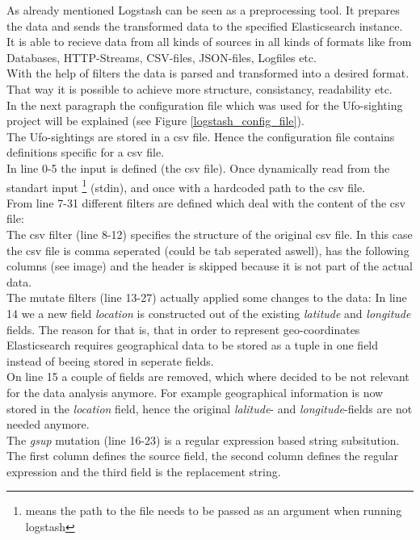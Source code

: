 \documentclass[bibliography=totoc]{article}
\begin{document}
As already mentioned Logstash can be seen as a preprocessing tool.
It prepares the data and sends the transformed data to the specified 
Elasticsearch instance.
It is able to recieve data from all kinds of sources in all kinds of formats like from Databases, HTTP-Streams, 
CSV-files, JSON-files, Logfiles etc.
\\
With the help of filters the data is parsed and transformed into a
desired format. That way it is possible to achieve more structure, consistancy,
readability etc.
\\
In the next paragraph the configuration file which was used for the
Ufo-sighting project will be explained (see Figure \ref{logstash_config_file}).
\\
The Ufo-sightings are stored in a csv file. Hence the configuration file 
contains definitions specific for a csv file.
\\
In line 0-5 the input is defined (the csv file). Once dynamically read 
from the standart input \footnote{means the path to the file needs to be passed as an argument when running logstash} (stdin),
and once with a hardcoded path to the csv file.
\\
From line 7-31 different filters are defined which deal with the content 
of the csv file:
\\
The csv filter (line 8-12) specifies the structure of the original csv file.
In this case the csv file is comma seperated (could be tab seperated aswell),
has the following columns (see image) and the header is skipped because
it is not part of the actual data.
\\
The mutate filters (line 13-27) actually applied some changes to the data:
In line 14 we a new field \textit{location} is constructed out of the 
existing \textit{latitude} and \textit{longitude} fields. The reason for 
that is, that in order to represent geo-coordinates Elasticsearch requires geographical data to be stored as a tuple
in one field instead of beeing stored in seperate fields.
\\
On line 15 a couple of fields are removed, which where decided to be not relevant
for the data analysis anymore. For example geographical information is now 
stored in the \textit{location} field, hence the original \textit{lalitude}- and \textit{longitude}-fields
are not needed anymore.
\\
The \textit{gsup} mutation (line 16-23) is a regular expression based string subsitution.
The first column defines the source field, the second column defines the regular expression
and the third field is the replacement string.
\end{document}
